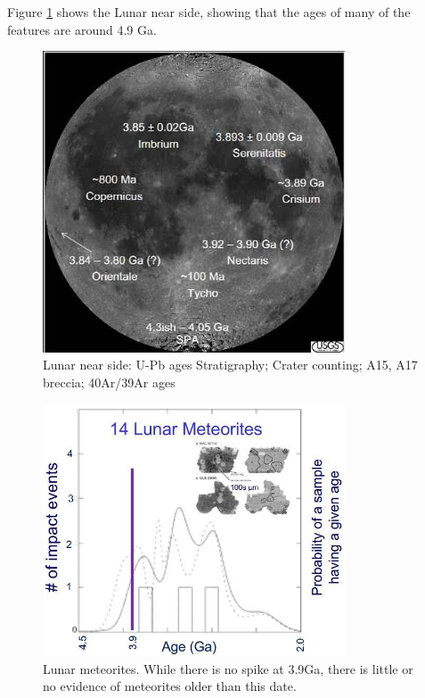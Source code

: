 \documentclass[]{article}
\begin{document}
Figure \ref{fig:TheCataclysm} shows the Lunar near side, showing that the ages of many of the features are around 4.9 Ga.
\begin{figure}[H]
	\caption[ Lunar near side]{ Lunar near side: U-Pb ages Stratigraphy; Crater counting; A15, A17 breccia; 40Ar/39Ar ages}\label{fig:TheCataclysm}
	\includegraphics[width=0.8\textwidth]{TheCataclysm}
\end{figure}

\begin{figure}[H]
	\caption[Lunar meteorites]{Lunar meteorites. While there is no spike at 3.9Ga, there is little or no evidence of meteorites older than this date.}
	\includegraphics[width=0.8\textwidth]{LunarMeteorites}
\end{figure}
\end{document}
